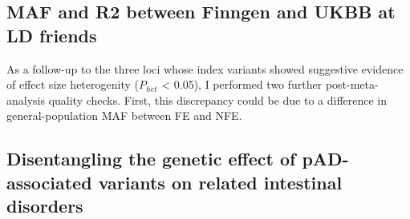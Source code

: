       
    
  \subsection{MAF and R2 between Finngen and UKBB at LD friends}
  As a follow-up to the three loci whose index variants showed suggestive evidence of effect size heterogenity ($P_{het}$ < 0.05), I performed two further post-meta-analysis quality checks. First, this discrepancy could be due to a difference in general-population MAF between FE and NFE. 
  \subsection{}
  \subsection{Disentangling the genetic effect of pAD-associated variants on related intestinal disorders}

